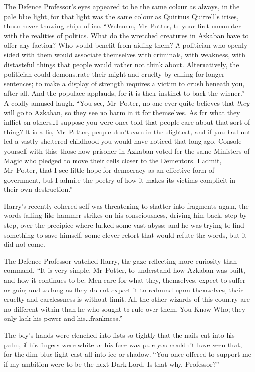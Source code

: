 The Defence Professor’s eyes appeared to be the same colour as always, in the pale blue light, for that light was the same colour as Quirinus Quirrell’s irises, those never-thawing chips of ice. “Welcome, Mr~Potter, to your first encounter with the realities of politics. What do the wretched creatures in Azkaban have to offer any faction? Who would benefit from aiding them? A politician who openly sided with them would associate themselves with criminals, with weakness, with distasteful things that people would rather not think about. Alternatively, the politician could demonstrate their might and cruelty by calling for longer sentences; to make a display of strength requires a victim to crush beneath you, after all. And the populace applauds, for it is their instinct to back the winner.” A coldly amused laugh. “You see, Mr~Potter, no-one ever quite believes that \emph{they} will go to Azkaban, so they see no harm in it for themselves. As for what they inflict on others…I suppose you were once told that people care about that sort of thing? It is a lie, Mr~Potter, people don’t care in the slightest, and if you had not led a vastly sheltered childhood you would have noticed that long ago. Console yourself with this: those now prisoner in Azkaban voted for the same Ministers of Magic who pledged to move their cells closer to the Dementors. I admit, Mr~Potter, that I see little hope for democracy as an effective form of government, but I admire the poetry of how it makes its victims complicit in their own destruction.”

Harry’s recently cohered self was threatening to shatter into fragments again, the words falling like hammer strikes on his consciousness, driving him back, step by step, over the precipice where lurked some vast abyss; and he was trying to find something to save himself, some clever retort that would refute the words, but it did not come.

The Defence Professor watched Harry, the gaze reflecting more curiosity than command. “It is very simple, Mr~Potter, to understand how Azkaban was built, and how it continues to be. Men care for what they, themselves, expect to suffer or gain; and so long as they do not expect it to redound upon themselves, their cruelty and carelessness is without limit. All the other wizards of this country are no different within than he who sought to rule over them, You-Know-Who; they only lack his power and his…frankness.”

The boy’s hands were clenched into fists so tightly that the nails cut into his palm, if his fingers were white or his face was pale you couldn’t have seen that, for the dim blue light cast all into ice or shadow. “You once offered to support me if my ambition were to be the next Dark Lord. Is that why, Professor?”

